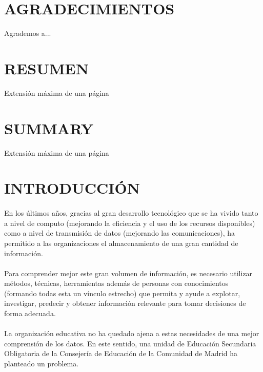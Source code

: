 \documentclass[spanish,12pt, a4paper,twoside]{paper}
\let\oldsection\section
\def\section{\cleardoublepage\oldsection}
\newcommand\blankpage{%
    \null
    \thispagestyle{empty}%
    \addtocounter{page}{-1}%
    \newpage}
\begin{document}
\afterpage{\blankpage}


\section*{AGRADECIMIENTOS}
Agrademos a...

\section*{RESUMEN}
Extensión máxima de una página


\section*{SUMMARY}
Extensión máxima de una página


\tableofcontents %



\listoffigures
\listoftables



\newpage
{} 


\section{INTRODUCCIÓN}
\paragraph{}

En los últimos años, gracias al gran desarrollo tecnológico que se ha vivido tanto a nivel de computo (mejorando la eficiencia y el uso de los recursos disponibles) como a nivel de transmisión de datos (mejorando las comunicaciones), ha permitido a las organizaciones el almacenamiento de una gran cantidad de información.

\paragraph{}
Para comprender mejor este gran volumen de información, es necesario utilizar métodos, técnicas, herramientas además de personas con conocimientos (formando todas esta un vínculo estrecho) que permita y ayude a explotar, investigar, predecir y obtener información relevante para tomar decisiones de forma adecuada.
\paragraph{}
La organización educativa no ha quedado ajena a estas necesidades de una mejor comprensión de los datos. En este sentido, una unidad de Educación Secundaria Obligatoria de la Consejería de Educación de la Comunidad de Madrid ha planteado un problema.
\end{document}
